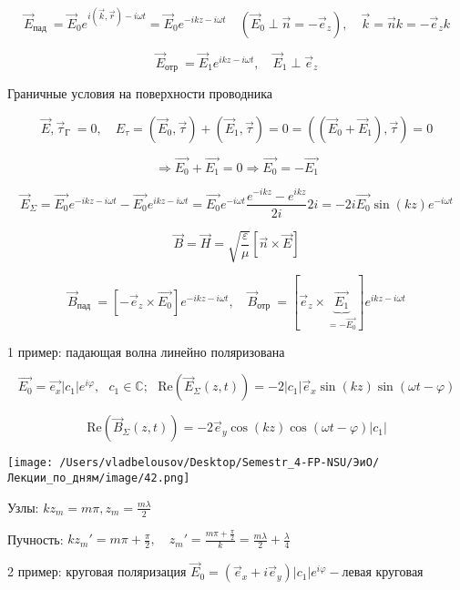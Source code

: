 \documentclass[12pt, a4paper]{report}
\begin{document}
\[ \vec{E } _{\text{пад } } =   \vec{E }  _ 0 e^{i (\vec{k},\vec{r }     )- i \omega t }  = \vec{E } _0 e^{- i k z - i \omega t } \quad ( \vec{E } _0 \perp \vec{n }  = - \vec{e } _z ), \quad \vec{k } = \vec{n } k = - \vec{e }_z k\] 

\[ \vec{E } _{\text{отр }  } = \vec{E } _1 e^{i kz - i \omega t }, \quad  \vec{E } _1 \perp \vec{e }_z     \] 

Граничные условия на поверхности проводника

\[ \vec{E } , \vec{\tau }_{\text{Г } } = 0 , \quad E_{\tau } =( \vec{E } _ 0 ,\vec{\tau } )+ ( \vec{E } _ 1 , \vec{\tau } ) = 0 = ((\vec{E } _0 + \vec{E } _1), \vec{\tau } )= 0      \] 

\[ \Rightarrow \vec{E_0} + \vec{E_1 } = 0 \Rightarrow \vec{E_0 } = -\vec{E_1}      \] 

\[ \vec{E}_{\Sigma } = \vec{E_0 }e^{ - i kz - i\omega t}  - \vec{E_0 }e^{i kz - i \omega t } = \vec{E_0 }e^{- i \omega t } \frac{ e^{- ikz } - e^{i kz } }{2i } 2 i= -2i \vec{E_0 }\sin (kz) e^{- i \omega t }          \] 

\[ \vec{B }  = \vec{H }  = \sqrt{\frac{ \varepsilon }{\mu } } [ \vec{n } \times  \vec{E } ]  \]

\[ \vec{B }_{\text{пад } } = [ - \vec{e } _z \times  \vec{E_0}  ]   e^{- ikz - i \omega t } , \quad  \vec{B }_{\text{отр } } = [  \vec{e } _z \times  \underbrace{\vec{E_1 }}_{= - \vec{E_0} } ] e^{ikz - i \omega t } \] 

1 пример: падающая волна линейно поляризована 

\[ \vec{E_0 } = \vec{e_x  }|c_1         | e^{i \varphi } , \text{ }  c_1 \in \mathbb{C} ; \text{ } \mathrm{Re }  (\vec{E }_{\Sigma }( z, t ))  = - 2 |c_1 | \vec{e } _x \sin(kz ) \sin (\omega t  - \varphi )        \] 

\[ \mathrm{Re } (\vec{B } _{\Sigma } (z, t ) ) = - 2 \vec{e }  _{y }  \cos ( kz ) \cos  ( \omega t - \varphi ) |c_1 | \] 

\begin{center}
    \texttt{[image: /Users/vladbelousov/Desktop/Semestr\_4-FP-NSU/ЭиО/Лекции\_по\_дням/image/42.png]}
\end{center}
Узлы: \( k z_{m }= m \pi , z_{m }  = \frac{m \lambda }{2 } \) 


Пучность: \( k z_{m } ' = m \pi + \frac{\pi}{2 } , \quad  z_m ' = \frac{ m \pi + \frac{\pi}{2} }{k } = \frac{m \lambda }{2} + \frac{\lambda}{ 4 }    \) 

2 пример: круговая поляризация \( \vec{E } _0 = ( \vec{e } _ x + i \vec{e } _ y ) |c_1 |e^{ i \varphi} - \text{левая круговая}  \) 
\end{document}
